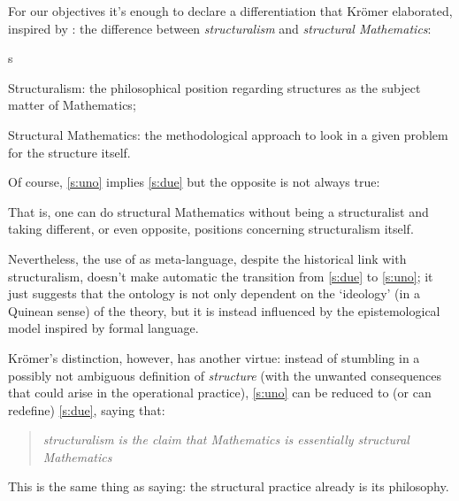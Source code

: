 For our objectives it's enough to declare a differentiation that Kr\"omer
elaborated, inspired by \cite{Cor96}: the difference between \emph{structuralism} and \emph{structural Mathematics}:
\begin{enumtag}{s}
	\item \label{s:uno} Structuralism: the philosophical position regarding structures as the subject matter of Mathematics;
	\item \label{s:due} Structural Mathematics: the methodological approach to look in a given problem for the structure itself.
\end{enumtag}
Of course, \ref{s:uno} implies \ref{s:due} but the opposite is not always true:
\begin{remark} \label{weak_structuralism}
	That is, one can do structural Mathematics without being a structuralist and taking different, or even opposite, positions concerning structuralism itself.

	Nevertheless, the use of \CT as meta-language, despite the historical link with structuralism, doesn't make automatic the transition from \ref{s:due} to \ref{s:uno}; it just suggests that the ontology is not only dependent on the `ideology' (in a Quinean sense) of the theory, but it is instead influenced by the epistemological model inspired by formal language.
\end{remark}
Kr\"omer's distinction, however, has another virtue: instead of stumbling in a possibly not ambiguous definition of \textit{structure} (with the unwanted consequences that could arise in the operational practice), \ref{s:uno} can be reduced to (or can redefine) \ref{s:due}, saying that:
\begin{quote}
	\emph{structuralism is the claim that Mathematics
		is essentially structural Mathematics} \cite{kromer2007tool}
\end{quote}
This is the same thing as saying: the structural practice already is its philosophy.

